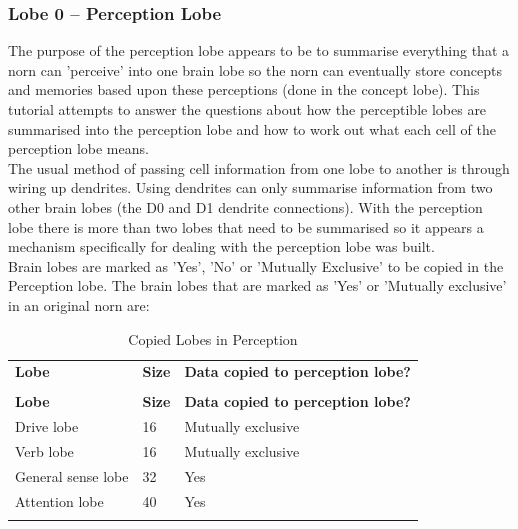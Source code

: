 \documentclass[11pt,twoside,a4paper]{article}
\begin{document}

\subsubsection{Lobe 0 -- Perception Lobe}


The purpose of the perception lobe appears to be to summarise everything that a norn can 'perceive' into one brain lobe so the norn can eventually store concepts and memories based upon these perceptions (done in the concept lobe). This tutorial attempts to answer the questions about how the perceptible lobes are summarised into the perception lobe and how to work out what each cell of the perception lobe means.~\\

The usual method of passing cell information from one lobe to another is through wiring up dendrites. Using dendrites can only summarise information from two other brain lobes (the D0 and D1 dendrite connections). With the perception lobe there is more than two lobes that need to be summarised so it appears a mechanism specifically for dealing with the perception lobe was built.~\\

Brain lobes are marked as 'Yes', 'No' or 'Mutually Exclusive' to be copied in the Perception lobe. The brain lobes that are marked as 'Yes' or 'Mutually exclusive' in an original norn are:
\begin{longtable}{|p{}|p{}|p{}|}
	\hline \rowcolor[gray]{0.50} \multicolumn{3}{|c|}{Copied Lobes in Perception} \\
	\hline \rowcolor[gray]{0.75} \textbf{Lobe} & \textbf{Size} & \textbf{Data copied to perception lobe?} \\ \hline
	\endfirsthead
	\hline \rowcolor[gray]{0.50} \multicolumn{3}{|c|}{Copied Lobes in Perception} \\
	\hline \rowcolor[gray]{0.75} \textbf{Lobe} & \textbf{Size} & \textbf{Data copied to perception lobe?} \\ \hline
	\endhead
	\hline 
	\endfoot
	Drive lobe		&	16 &	Mutually exclusive \\ \hline
	Verb lobe		&	16 &	Mutually exclusive \\ \hline
	General sense lobe	&	32 &	Yes \\ \hline
	Attention lobe 		&	40 &	Yes \\ \hline
	\caption{Copied Lobes in Perception}
	\label{tab:Copied_Lobes_in_Perception}\\
\end{longtable}
\end{document}
